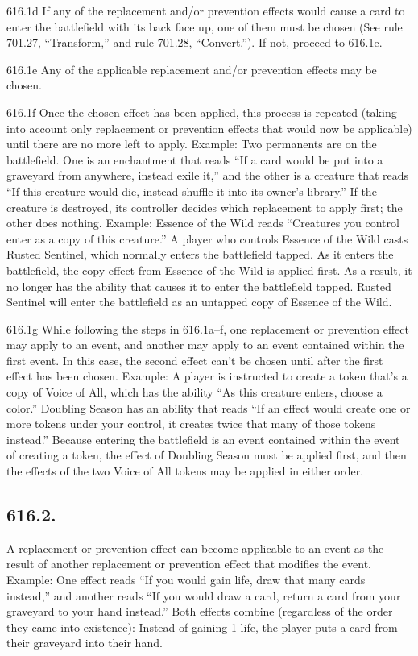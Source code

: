 616.1d If any of the replacement and/or prevention effects would cause a card to enter the battlefield with its back face up, one of them must be chosen (See rule 701.27, “Transform,” and rule 701.28, “Convert.”). If not, proceed to 616.1e.

616.1e Any of the applicable replacement and/or prevention effects may be chosen.

616.1f Once the chosen effect has been applied, this process is repeated (taking into account only replacement or prevention effects that would now be applicable) until there are no more left to apply.
Example: Two permanents are on the battlefield. One is an enchantment that reads “If a card would be put into a graveyard from anywhere, instead exile it,” and the other is a creature that reads “If this creature would die, instead shuffle it into its owner’s library.” If the creature is destroyed, its controller decides which replacement to apply first; the other does nothing.
Example: Essence of the Wild reads “Creatures you control enter as a copy of this creature.” A player who controls Essence of the Wild casts Rusted Sentinel, which normally enters the battlefield tapped. As it enters the battlefield, the copy effect from Essence of the Wild is applied first. As a result, it no longer has the ability that causes it to enter the battlefield tapped. Rusted Sentinel will enter the battlefield as an untapped copy of Essence of the Wild.

616.1g While following the steps in 616.1a–f, one replacement or prevention effect may apply to an event, and another may apply to an event contained within the first event. In this case, the second effect can’t be chosen until after the first effect has been chosen.
Example: A player is instructed to create a token that’s a copy of Voice of All, which has the ability “As this creature enters, choose a color.” Doubling Season has an ability that reads “If an effect would create one or more tokens under your control, it creates twice that many of those tokens instead.” Because entering the battlefield is an event contained within the event of creating a token, the effect of Doubling Season must be applied first, and then the effects of the two Voice of All tokens may be applied in either order.

\subsection*{616.2.}
A replacement or prevention effect can become applicable to an event as the result of another replacement or prevention effect that modifies the event.
Example: One effect reads “If you would gain life, draw that many cards instead,” and another reads “If you would draw a card, return a card from your graveyard to your hand instead.” Both effects combine (regardless of the order they came into existence): Instead of gaining 1 life, the player puts a card from their graveyard into their hand.

